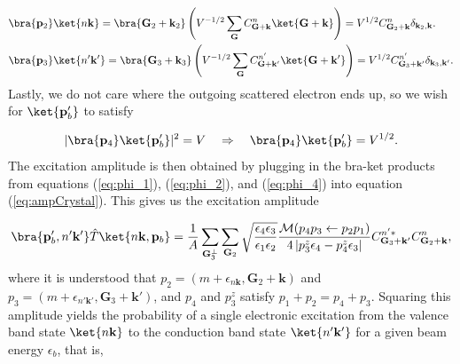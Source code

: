 \documentclass{article}
\begin{document}
\begin{equation} 
  \label{eq:phi_2} 
  \begin{aligned}
    &\bra{\mathbf{p}_2}\ket{n\mathbf{k}}
    =
    \bra{\mathbf{G}_2 + \mathbf{k}_2}
    \left(
        V^{-1/2}\sum_{\mathbf{G}}
        C_{\mathbf{G+k}}^n \ket{\mathbf{G+k}}
    \right)
    =
    V^{1/2}C^n_{\mathbf{G}_2+\mathbf{k}}
    \delta_{\mathbf{k}_2,\mathbf{k}}.
    \\&
    \bra{\mathbf{p}_3}\ket{n'\mathbf{k'}}
    =
    \bra{\mathbf{G}_3 + \mathbf{k}_3}
    \left(
        V^{-1/2}\sum_{\mathbf{G}}
        C_{\mathbf{G+k'}}^{n'} \ket{\mathbf{G+k'}}
    \right)
    =
    V^{1/2}C^{n'}_{\mathbf{G}_3+\mathbf{k'}}
    \delta_{\mathbf{k}_3,\mathbf{k'}}.
  \end{aligned}
\end{equation}
%
Lastly, we do not care where the outgoing scattered electron ends up, so we
wish for $\ket{\mathbf{p}_b'}$ to satisfy

\begin{equation} 
  \label{eq:phi_4}
    |\bra{\mathbf{p}_4}\ket{\mathbf{p}_b'}|^2
    =
    V \quad\Rightarrow\quad \bra{\mathbf{p}_4}\ket{\mathbf{p}_b'}
    =
    V^{1/2}.
\end{equation}
%
The excitation amplitude is then obtained by plugging in the bra-ket products from
equations (\ref{eq:phi_1}), (\ref{eq:phi_2}), and (\ref{eq:phi_4}) into
equation (\ref{eq:ampCrystal}). This gives us the excitation amplitude

\begin{equation} 
  \begin{aligned}
      \bra{\mathbf{p}_b', n'\mathbf{k'}} \hat{T} \ket{n\mathbf{k},\mathbf{p}_b}
      =
      \frac{1}{A}
      \sum_{\mathbf{G}_3^\perp} \sum_{\mathbf{G}_2}
      \sqrt{\frac{ \epsilon_4\epsilon_3 }{ \epsilon_1\epsilon_2 }}
      \frac{\mathcal{M}(p_4p_3\leftarrow p_2p_1)}
      {4\left|p_3^z\epsilon_4 - p_4^z\epsilon_3\right|}
      C_{\mathbf{G}_3+\mathbf{k'}}^{n'\ast} C_{\mathbf{G}_2+\mathbf{k}}^{n},
  \end{aligned}
  \label{eq:ampCode} 
\end{equation}
%
where it is understood that $p_2 = (m + \epsilon_{n\mathbf{k}},
\mathbf{G}_2 + \mathbf{k})$ and
$p_3 = (m + \epsilon_{n'\mathbf{k'}}, \mathbf{G}_3 + \mathbf{k'})$,
%
and $p_4$ and $p_3^z$ satisfy $p_1 + p_2 = p_4 + p_3$.
Squaring this amplitude yields the probability of a single electronic
excitation from the valence band state $\ket{n\mathbf{k}}$ to the conduction
band state $\ket{n'\mathbf{k'}}$ for a given beam energy $\epsilon_b$, that is,
\end{document}
